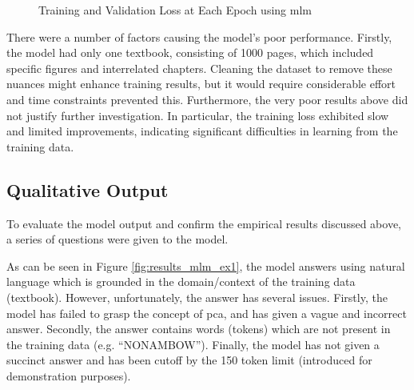 \begin{figure}[ht!]
\centering
{}
\caption{Training and Validation Loss at Each Epoch using \acrshort{mlm}}
\label{fig:results_mlm_loss}
\end{figure}

There were a number of factors causing the model's poor performance. Firstly, the model had only one textbook, consisting of 1000 pages, which included specific figures and interrelated chapters. Cleaning the dataset to remove these nuances might enhance training results, but it would require considerable effort and time constraints prevented this. Furthermore, the very poor results above did not justify further investigation. In particular, the training loss exhibited slow and limited improvements, indicating significant difficulties in learning from the training data.

\subsection{Qualitative Output}
To evaluate the model output and confirm the empirical results discussed above, a series of questions were given to the model.

As can be seen in Figure \ref{fig:results_mlm_ex1}, the model answers using natural language which is grounded in the domain/context of the training data (textbook). However, unfortunately, the answer has several issues. Firstly, the model has failed to grasp the concept of \acrfull{pca}, and has given a vague and incorrect answer. Secondly, the answer contains words (tokens) which are not present in the training data (e.g. ``NONAMBOW''). Finally, the model has not given a succinct answer and has been cutoff by the 150 token limit (introduced for demonstration purposes). 

